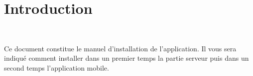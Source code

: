 \chapter*{Introduction}
\thispagestyle{plain}
~\\[1cm]
{ \large

Ce document constitue le manuel d'installation de l'application. Il vous sera indiqué
comment installer dans un premier temps la partie serveur puis dans un second temps l'application mobile.
}
